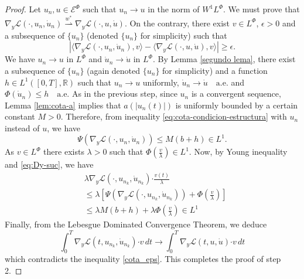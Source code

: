 \documentclass[twoside]{article}
\theoremstyle{remark}
\newcommand{\lphi}{L^{\Phi}}
\newcommand{\wphi}{W^{1}\lphi}
\newcommand{\domi}{\mathcal{E}^{\Phi}}
\renewcommand{\b}[1]{\boldsymbol{#1}}
\newcommand{\rr}{\mathbb{R}}
\newcommand{\ccdot}{\b{\cdot}}
\renewcommand{\leq}{\leqslant}
\renewcommand{\geq}{\geqslant}
\begin{document}
\begin{proof}
Let $u_n,u\in \domi$ such that $u_n\to u$ in the norm of $\wphi$. 
We must prove that  $\nabla_y\mathcal{L}(\cdot,u_n,\dot{u}_n)\overset{w^*}{\rightharpoonup} 
\nabla_y\mathcal{L}(\cdot,u,\dot{u})$. 
On the contrary, there exist $v\in\lphi$, $\epsilon>0$ and a subsequence of $\{u_n\}$ (denoted  $\{u_n\}$ for simplicity)  such that
\begin{equation}\label{cota_eps}
 \left| \langle \nabla_y\mathcal{L}(\cdot,u_n,\dot{u}_n),v \rangle - 
\langle  \nabla_y\mathcal{L}(\cdot,u,\dot{u}),v \rangle\right|\geq \epsilon.
\end{equation}
We have $u_n\rightarrow u$ in $\lphi$ and
$\dot{u}_n\rightarrow \dot{u}$ in $\lphi$.
 By Lemma \ref{segundo lema}, there exist a subsequence of $\{u_n\}$ (again denoted  $\{u_n\}$ for simplicity) 
and a function $h\in L^1([0,T],\rr)$ such that 
$u_n\rightarrow u$ uniformly, $\dot{u}_n\rightarrow \dot{u} \quad\text{a.e.}$ and $\Phi(\dot{u}_n)\leq h\quad\text{a.e.}$ 
As in the previous step, since $u_n$ is a convergent sequence, 
Lemma \ref{lem:cota-a} implies that $a(|u_n(t)|)$ is uniformly bounded by a certain constant $M>0$. 
Therefore,   from inequality  \eqref{eq:cota-condicion-estructura} with $u_n$ instead of $u$, we have 
\begin{equation}\label{eq:Dy-suc}
  \Psi(\nabla_y\mathcal{L}(\cdot,u_n,\dot{u}_n))   
	\leq M (b+h)\in L^1.
\end{equation}
As $v \in \lphi$ there exists $\lambda>0$ such that $\Phi(\frac{v}{\lambda})\in L^1$. 
Now, by Young inequality and \eqref{eq:Dy-suc}, we have
\begin{equation}\label{eq:Dy_lambda-Psi}
\begin{split}
&\lambda \nabla_y\mathcal{L}(\cdot,u_{n_k},\dot{u}_{n_k})\ccdot \frac{v(t)}{\lambda} 
\\
&
\leq 
\lambda\left[\Psi(\nabla_y\mathcal{L}(\cdot,u_{n_k},\dot{u}_{n_k}))+\Phi\left(\frac{v}{\lambda}\right)\right]
\\
&\leq \lambda M (b+h)+\lambda \Phi\left(\frac{v}{\lambda}\right)\in L^1
\end{split}
\end{equation}
  Finally, from the Lebesgue Dominated Convergence Theorem, we deduce
\begin{equation}\label{conv_debil}
\int_0^T  \nabla_y\mathcal{L}(t,u_{n_k},\dot{u}_{n_k})
\ccdot  v \,dt 
\to 
\int_0^T \nabla_y\mathcal{L}(t,u,\dot{u})\ccdot v\, dt \end{equation}
which contradicts the inequality \eqref{cota_eps}. This completes the proof of step 2.


\end{proof}
\end{document}
